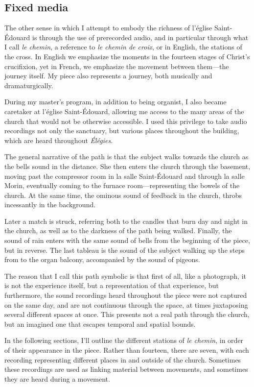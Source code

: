 \documentclass[12pt,twoside,maitrise]{dms_ks}
\theoremstyle{definition}
\begin{document}
{\subsection{Fixed media}

The other sense in which I attempt to embody the richness of l'église Saint-Édouard is through the use of prerecorded audio, and in particular through what I call \textit{le chemin}, a reference to \textit{le chemin de croix}, or in English, the stations of the cross. 
In English we emphasize the moments in the fourteen stages of Christ's crucifixion, yet in French, we emphasize the movement between them---the journey itself. 
My piece also represents a journey, both musically and dramaturgically. 

During my master's program, in addition to being organist, I also became caretaker at l'église Saint-Édouard, allowing me access to the many areas of the church that would not be otherwise accessible. 
I used this privilege to take audio recordings not only the sanctuary, but various places throughout the building, which are heard throughout \textit{Élégies}. 

The general narrative of the path is that the subject walks towards the church as the bells sound in the distance. 
She then enters the church through the basement, moving past the compressor room in la salle Saint-Édouard and through la salle Morin, eventually coming to the furnace room---representing the bowels of the church. 
At the same time, the ominous sound of feedback in the church, throbs incessantly in the background.

Later a match is struck, referring both to the candles that burn day and night in the church, as well as to the darkness of the path being walked. 
Finally, the sound of rain enters with the same sound of bells from the beginning of the piece, but in reverse. 
The last tableau is the sound of the subject walking up the steps from to the organ balcony, accompanied by the sound of pigeons.

The reason that I call this path symbolic is that first of all, like a photograph, it is not the experience itself, but a representation of that experience, but furthermore, the sound recordings heard throughout the piece were not captured on the same day, and are not continuous through the space, at times juxtaposing several different spaces at once. 
This presents not a real path through the church, but an imagined one that escapes temporal and spatial bounds.

In the following sections, I'll outline the different stations of \textit{le chemin}, in order of their appearance in the piece. 
Rather than fourteen, there are seven, with each recording representing different places in and outside of the church. 
Sometimes these recordings are used as linking material between movements, and sometimes they are heard during a movement.

}
\end{document}
